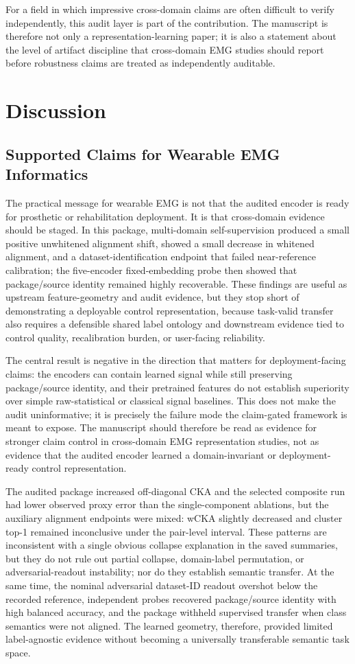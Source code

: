 \documentclass[journal]{IEEEtran}
\begin{document}
For a field in which impressive cross-domain claims are often difficult to verify independently, this audit layer is part of the contribution. The manuscript is therefore not only a representation-learning paper; it is also a statement about the level of artifact discipline that cross-domain EMG studies should report before robustness claims are treated as independently auditable.

\section{Discussion}
\subsection{Supported Claims for Wearable EMG Informatics}
The practical message for wearable EMG is not that the audited encoder is ready for prosthetic or rehabilitation deployment. It is that cross-domain evidence should be staged. In this package, multi-domain self-supervision produced a small positive unwhitened alignment shift, showed a small decrease in whitened alignment, and a dataset-identification endpoint that failed near-reference calibration; the five-encoder fixed-embedding probe then showed that package/source identity remained highly recoverable. These findings are useful as upstream feature-geometry and audit evidence, but they stop short of demonstrating a deployable control representation, because task-valid transfer also requires a defensible shared label ontology and downstream evidence tied to control quality, recalibration burden, or user-facing reliability.

The central result is negative in the direction that matters for deployment-facing claims: the encoders can contain learned signal while still preserving package/source identity, and their pretrained features do not establish superiority over simple raw-statistical or classical signal baselines. This does not make the audit uninformative; it is precisely the failure mode the claim-gated framework is meant to expose. The manuscript should therefore be read as evidence for stronger claim control in cross-domain EMG representation studies, not as evidence that the audited encoder learned a domain-invariant or deployment-ready control representation.

The audited package increased off-diagonal CKA and the selected composite run had lower observed proxy error than the single-component ablations, but the auxiliary alignment endpoints were mixed: wCKA slightly decreased and cluster top-1 remained inconclusive under the pair-level interval. These patterns are inconsistent with a single obvious collapse explanation in the saved summaries, but they do not rule out partial collapse, domain-label permutation, or adversarial-readout instability; nor do they establish semantic transfer. At the same time, the nominal adversarial dataset-ID readout overshot below the recorded reference, independent probes recovered package/source identity with high balanced accuracy, and the package withheld supervised transfer when class semantics were not aligned. The learned geometry, therefore, provided limited label-agnostic evidence without becoming a universally transferable semantic task space.
\end{document}
